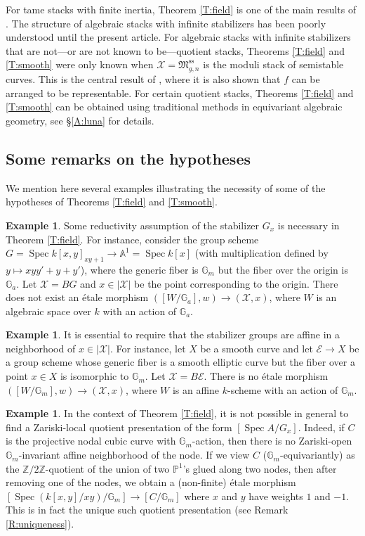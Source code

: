 \documentclass[a4paper]{amsart}
\theoremstyle{plain}
\theoremstyle{definition}
\newtheorem{example}[theorem]{Example}
\theoremstyle{remark}
\numberwithin{equation}{section}
\newcommand{\GG}{\mathbb{G}}
\newcommand{\PP}{\mathbb{P}}
\renewcommand\AA{\mathbb{A}}
\newcommand\ZZ{\mathbb{Z}}
\newcommand\fM{\mathfrak{M}}
\newcommand\cE{\mathcal{E}}
\newcommand\cX{\mathcal{X}}
\DeclareMathOperator{\Spec}{Spec}
\renewcommand{\ss}{\mathrm{ss}}
\begin{document}
For tame stacks with finite inertia, Theorem \ref{T:field} is one of the main results of \cite{tame}. The structure of algebraic stacks with infinite stabilizers has been poorly understood until the present article. 
For algebraic stacks with infinite stabilizers that are not---or are not known to be---quotient stacks, Theorems \ref{T:field} and \ref{T:smooth} were only known when $\cX = \fM_{g,n}^{\ss}$ is the 
moduli stack of semistable curves. This is the central result of \cite{alper-kresch}, where it is also shown that $f$ can be arranged to be representable. For certain quotient stacks, Theorems \ref{T:field} and \ref{T:smooth} can be obtained 
using traditional methods in equivariant algebraic geometry, see \S\ref{A:luna} for details. 

\subsection{Some remarks on the hypotheses}
We mention here several examples illustrating the necessity of some of the hypotheses of Theorems \ref{T:field} and \ref{T:smooth}.

\begin{example} \label{ex1}
Some reductivity assumption of the stabilizer $G_x$ is necessary in Theorem \ref{T:field}.  For instance,  consider the group scheme $G= \Spec k[x,y]_{xy+1} \to \AA^1 = \Spec k[x]$ (with multiplication defined by $y \mapsto xyy' + y + y'$), where the generic fiber is $\GG_m$ but the fiber over the origin is $\GG_a$.  Let $\cX = BG$ and $x \in |\cX|$ be the point corresponding to the origin.  There does not exist an \'etale morphism $([W/ \GG_a], w) \to (\cX, x)$, where $W$ is an algebraic space over $k$ with an action of $\GG_a$.
\end{example}

\begin{example} \label{ex2}
It is essential to require that the stabilizer groups are affine in a neighborhood of $x \in |\cX|$.  For instance, let $X$ be a smooth curve and let $\cE \to X$ be a group scheme whose generic fiber is a smooth elliptic curve but the fiber over a point $x \in X$ is isomorphic to $\GG_m$.  Let $\cX = B\cE$.  There is no \'etale morphism $([W/ \GG_m], w) \to (\cX, x)$, where $W$ is an affine $k$-scheme with an action of $\GG_m$.
\end{example}


\begin{example} \label{ex3}
In the context of Theorem \ref{T:field}, it is not possible in general to find a Zariski-local quotient presentation of the form $[\Spec A/G_x]$.  Indeed, if $C$ is the projective nodal cubic curve with $\GG_m$-action, then there is no Zariski-open $\GG_m$-invariant affine neighborhood of the node.  If we view $C$ ($\GG_m$-equivariantly) as the $\ZZ/2\ZZ$-quotient of the union of two $\PP^1$'s glued along two nodes, then after removing one of the nodes, we obtain a (non-finite) \'etale morphism $[\Spec(k[x,y]/xy)/\GG_m] \to [C/\GG_m]$ where $x$ and $y$ have weights $1$ and $-1$.  This is in fact the unique such quotient presentation (see Remark \ref{R:uniqueness}).
\end{example}
\end{document}

